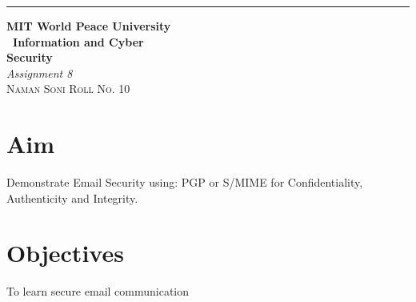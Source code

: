 \documentclass{article}
\begin{document}
	\begin{titlepage} %
	
	\raggedleft\rule{1pt}{\textheight} %
	\hspace{0.05\textwidth} %
	\parbox[b]{0.75\textwidth}
	{ %
		
		{\Huge\bfseries MIT World Peace University \\[0.5\baselineskip] \ Information and Cyber \\ Security}\\[2\baselineskip] %
		{\large\textit{Assignment 8}}\\[4\baselineskip] %
		{\Large\textsc{Naman Soni Roll No. 10}} %
		
		\vspace{0.5\textheight} %
	}
	
\end{titlepage}
\tableofcontents
\pagebreak
\section{\textbf{Aim}}
Demonstrate Email Security using: PGP or S/MIME for Confidentiality, Authenticity and Integrity.
\section{\textbf{Objectives}}
To learn secure email communication
\end{document}
